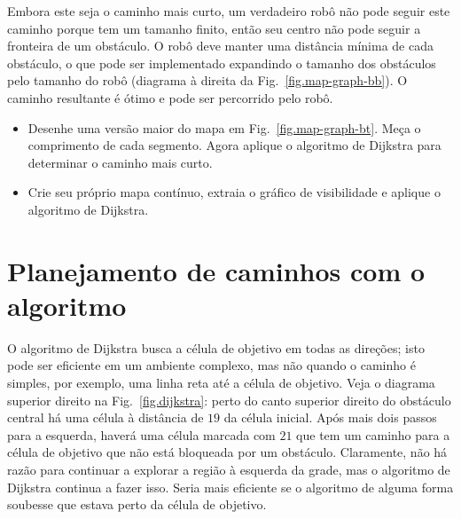 Embora este seja o caminho mais curto, um verdadeiro robô não pode seguir este caminho porque tem um tamanho finito, então seu centro não pode seguir a fronteira de um obstáculo. O robô deve manter uma distância mínima de cada obstáculo, o que pode ser implementado expandindo o tamanho dos obstáculos pelo tamanho do robô (diagrama à direita da Fig.~\ref{fig.map-graph-bb}). O caminho resultante é ótimo e pode ser percorrido pelo robô.

\begin{framed}
\begin{itemize}
\item Desenhe uma versão maior do mapa em Fig.~\ref{fig.map-graph-bt}. Meça o comprimento de cada segmento. Agora aplique o algoritmo de Dijkstra para determinar o caminho mais curto.
\item Crie seu próprio mapa contínuo, extraia o gráfico de visibilidade e aplique o algoritmo de Dijkstra.
\end{itemize}
\end{framed}

\section{Planejamento de caminhos com o algoritmo \astar}\label{s.astar}

O algoritmo de Dijkstra busca a célula de objetivo em todas as direções; isto pode ser eficiente em um ambiente complexo, mas não quando o caminho é simples, por exemplo, uma linha reta até a célula de objetivo. Veja o diagrama superior direito na Fig.~\ref{fig.dijkstra}: perto do canto superior direito do obstáculo central há uma célula à distância de $19$ da célula inicial. Após mais dois passos para a esquerda, haverá uma célula marcada com $21$ que tem um caminho para a célula de objetivo que não está bloqueada por um obstáculo. Claramente, não há razão para continuar a explorar a região à esquerda da grade, mas o algoritmo de Dijkstra continua a fazer isso. Seria mais eficiente se o algoritmo de alguma forma soubesse que estava perto da célula de objetivo.

